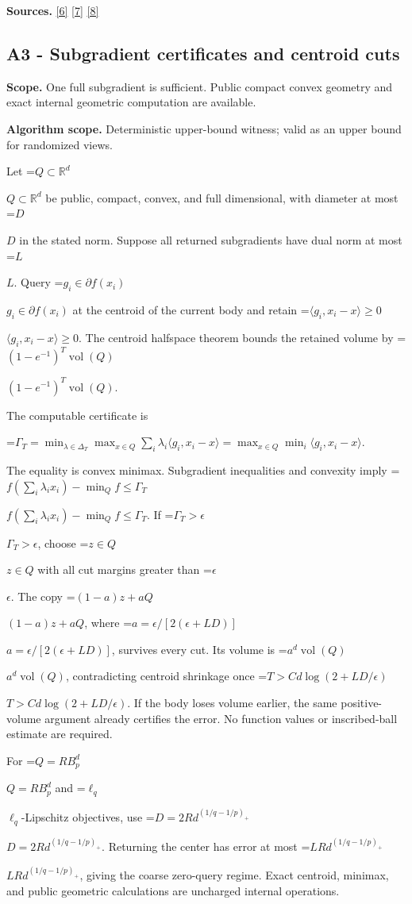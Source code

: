 \documentclass[10pt,a4paper]{article}
\newcommand{\AtlasMath}[1]{\par\begingroup\centering\setbox0=\hbox{$\displaystyle #1$}\ifdim\wd0>1.4\linewidth\typeout{ATLAS WIDE FORMULA: \the\wd0}\fi\ifdim\wd0>\linewidth\resizebox{\linewidth}{!}{\box0}\else\box0\fi\par\endgroup}
\newcommand{\AtlasInlineMath}[1]{\begingroup\setbox0=\hbox{$#1$}\ifdim\wd0>.4\linewidth\endgroup\AtlasMath{#1}\else\endgroup$#1$\fi}
\begin{document}
\textbf{Sources.} \href{https://arxiv.org/pdf/2101.09740v2}{[6]} \href{https://arxiv.org/pdf/2609.33360v2}{[7]} \href{https://arxiv.org/pdf/2609.10874}{[8]}

\subsection{A3 - Subgradient certificates and centroid cuts}
\textbf{Scope.} One full subgradient is sufficient. Public compact convex geometry and exact internal geometric computation are available.

\textbf{Algorithm scope.} Deterministic upper-bound witness; valid as an upper bound for randomized views.

Let \AtlasInlineMath{Q\subset\mathbb R^d} be public, compact, convex, and full dimensional, with diameter at most \AtlasInlineMath{D} in the stated norm. Suppose all returned subgradients have dual norm at most \AtlasInlineMath{L}. Query \AtlasInlineMath{g_i\in\partial f(x_i)} at the centroid of the current body and retain \AtlasInlineMath{\langle g_i,x_i-x\rangle\ge0}. The centroid halfspace theorem bounds the retained volume by \AtlasInlineMath{(1-e^{-1})^T\operatorname{vol}(Q)}.

The computable certificate is

\AtlasMath{\Gamma_T=\min_{\lambda\in\Delta_T}\max_{x\in Q}\sum_i\lambda_i\langle g_i,x_i-x\rangle
=\max_{x\in Q}\min_i\langle g_i,x_i-x\rangle.}

The equality is convex minimax. Subgradient inequalities and convexity imply
\AtlasInlineMath{f(\sum_i\lambda_ix_i)-\min_Qf\le\Gamma_T}.
If \AtlasInlineMath{\Gamma_T>\epsilon}, choose \AtlasInlineMath{z\in Q} with all cut margins greater than \AtlasInlineMath{\epsilon}. The copy \AtlasInlineMath{(1-a)z+aQ}, where \AtlasInlineMath{a=\epsilon/[2(\epsilon+LD)]}, survives every cut. Its volume is \AtlasInlineMath{a^d\operatorname{vol}(Q)}, contradicting centroid shrinkage once \AtlasInlineMath{T>C d\log(2+LD/\epsilon)}. If the body loses volume earlier, the same positive-volume argument already certifies the error. No function values or inscribed-ball estimate are required.

For \AtlasInlineMath{Q=RB_p^d} and \AtlasInlineMath{\ell_q}-Lipschitz objectives, use \AtlasInlineMath{D=2Rd^{(1/q-1/p)_+}}. Returning the center has error at most \AtlasInlineMath{LRd^{(1/q-1/p)_+}}, giving the coarse zero-query regime. Exact centroid, minimax, and public geometric calculations are uncharged internal operations.
\end{document}
